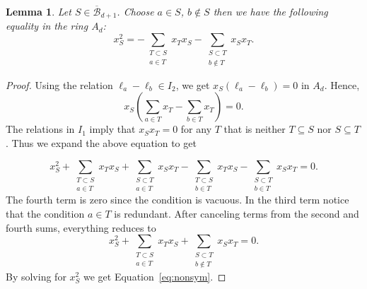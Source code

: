 \documentclass[10pt,a4paper]{amsart}
\newtheorem{lemm}[thm]{Lemma}
\theoremstyle{definition}
\renewcommand\l{\ell}
\newcommand{\hB}{\overline{\mathcal B}}
\begin{document}
\begin{lemm}\label{lem:nonsym}
	Let $S\in\hB_{d+1}$. Choose $a\in S$, $b\notin S$ then we have the following equality in the ring $A_d$:
	\begin{equation}\label{eq:nonsym}
	x_S^2 = -\sum_{\substack{T\subset S \\ a\in T}}x_Tx_S -\sum_{\substack{S\subset T \\ b\notin T}} x_Sx_T.
	\end{equation}
\end{lemm}
\begin{proof}
	Using the relation $\l_a-\l_b\in I_2$, we get $x_S(\l_a-\l_b)=0$ in $A_d$. Hence, %
	\begin{equation}
	x_S\left(\sum_{a\in T}x_T-\sum_{b\in T}x_T\right) = 0.
	\end{equation}
	The relations in $I_1$ imply that $x_S x_T=0$ for any $T$ that is neither $T\subseteq S$ nor $S\subseteq T$. Thus we expand the above equation to get
	
	\begin{equation}
	x_S^2+\sum_{ \substack{T\subset S\\ a\in T}} x_Tx_S + \sum_{\substack{S\subset T\\ a\in T}} x_Sx_T - \sum_{ \substack{T\subset S\\ b\in T}} x_Tx_S - \sum_{\substack{S\subset T\\ b\in T}} x_Sx_T = 0.
	\end{equation}
	The fourth term is zero since the condition is vacuous. In the third term notice that the condition $a\in T$ is redundant. After canceling terms from the second and fourth sums, everything reduces to
	\[
	x_S^2+\sum_{\substack{T\subset S \\ a\in T}}x_Tx_S + \sum_{\substack{S\subset T \\ b\notin T}}x_Sx_T = 0.
	\]
	By solving for $x_S^2$ we get Equation~\eqref{eq:nonsym}.
\end{proof}
\end{document}
